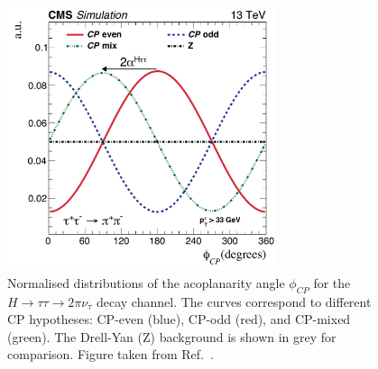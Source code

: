\begin{figure}[!htbp]
\centering
\includegraphics[width=0.7\textwidth]{Figures/Chapter2/AcoplanarityScenarios.pdf}
\caption[Acoplanarity angle $\phi_{CP}$ distributions for different CP hypotheses in $H \rightarrow \tau\tau$ decays]{Normalised distributions of the acoplanarity angle $\phi_{CP}$ for the $H \rightarrow \tau\tau \rightarrow 2\pi\nu_{\tau}$ decay channel. The curves correspond to different CP hypotheses: CP-even (blue), CP-odd (red), and CP-mixed (green). The Drell-Yan (Z) background is shown in grey for comparison. Figure taken from Ref.~\cite{HiggsCP_CMS_2021}.}
\label{Figure:Chapter2_PhiCP_Gen}
\end{figure}